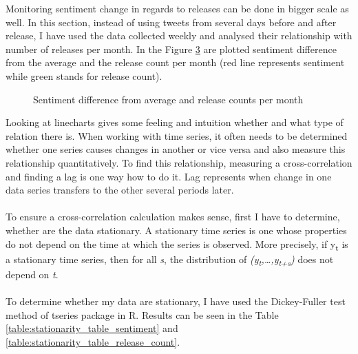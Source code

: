 Monitoring sentiment change in regards to releases can be done in bigger scale as well. In this section, instead of using tweets from several days before and after release, I have used the data collected weekly and analysed their relationship with number of releases per month. In the Figure \ref{fig:ReleasesSentiment3} are plotted sentiment difference from the average and the release count per month (red line represents sentiment while green stands for release count).

\begin{figure}[H]%
    \centering
    \qquad
    \label{fig:ReleasesSentiment1}%
\end{figure}


\begin{figure}[H]%
    \centering
    \qquad
    \label{fig:ReleasesSentiment2}%
\end{figure}


\begin{figure}[H]%
    \centering
    \qquad
        \caption{Sentiment difference from average and release counts per month}
    \label{fig:ReleasesSentiment3}%
\end{figure}

Looking at linecharts gives some feeling and intuition whether and what type of relation there is. When working with time series, it often needs to be determined whether one series causes changes in another or vice versa and also measure this relationship quantitatively. To find this relationship, measuring a cross-correlation and finding a lag is one way how to do it. Lag represents when change in one data series transfers to the other several periods later. \\
\\
To ensure a cross-correlation calculation makes sense, first I have to determine, whether are the data stationary. A stationary time series is one whose properties do not depend on the time at which the series is observed\cite{hyndman5forecast}. More precisely, if y\textsubscript{t} is a stationary time series, then for all \textit{s}, the distribution of \textit{(y\textsubscript{t},…,y\textsubscript{t+s})} does not depend on \textit{t}.\\
\\
To determine whether my data are stationary, I have used the Dickey-Fuller test method of tseries package in R. Results can be seen in the Table \ref{table:stationarity_table_sentiment} and \ref{table:stationarity_table_release_count}.

